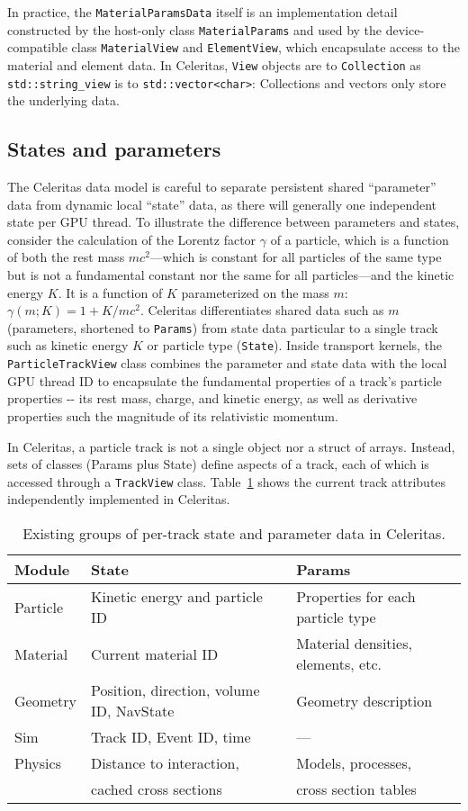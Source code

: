 In practice, the \texttt{MaterialParamsData} itself is an implementation
detail constructed by the host-only class \texttt{MaterialParams} and
used by the device-compatible class \texttt{MaterialView} and
\texttt{ElementView}, which encapsulate access to the material and
element data. In Celeritas, \texttt{View} objects are to
\texttt{Collection} as \texttt{std::string\_view} is to
\texttt{std::vector\textless{}char\textgreater{}}: Collections and
vectors only store the underlying data.

\subsection{States and parameters}\label{states-and-parameters}

The Celeritas data model is careful to separate persistent shared
``parameter'' data from dynamic local ``state'' data, as there will
generally one independent state per GPU thread. To illustrate the
difference between parameters and states, consider the calculation of
the Lorentz factor \(\gamma\) of a particle, which is a function of both
the rest mass \(mc^2\)---which is constant for all particles of the same
type but is not a fundamental constant nor the same for all
particles---and the kinetic energy \(K\). It is a function of $K$
parameterized on the mass $m$: \(\gamma(m;K) = 1 + K / mc^2\). Celeritas
differentiates shared data such as \(m\) (parameters, shortened to
\texttt{Params}) from state data particular to a single track such as
kinetic energy \(K\) or particle type (\texttt{State}). Inside transport
kernels, the \texttt{ParticleTrackView} class combines the parameter and
state data with the local GPU thread ID to encapsulate the fundamental
properties of a track's particle properties -\/- its rest mass, charge,
and kinetic energy, as well as derivative properties such the magnitude
of its relativistic momentum.

In Celeritas, a particle track is not a single object nor a struct of
arrays. Instead, sets of classes (Params plus State) define aspects of a
track, each of which is accessed through a \texttt{TrackView} class.
Table~\ref{tab:modules} shows the current track attributes independently
implemented in Celeritas.
%
\begin{table}[htb]
  \centering%
  \caption{Existing groups of per-track state and parameter data in Celeritas.}%
  \begin{tabular}{@{}lll@{}}
\toprule
Module & State & Params\tabularnewline
\midrule
Particle & Kinetic energy and particle ID & Properties for each particle
type \\
Material & Current material ID & Material densities, elements,
etc. \\
Geometry & Position, direction, volume ID, NavState & Geometry
description \\
Sim & Track ID, Event ID, time & --- \\
Physics & Distance to interaction, & Models, processes, \\
& cached cross sections & cross section tables \\
\bottomrule
  \end{tabular}
  \label{tab:modules}
\end{table}

